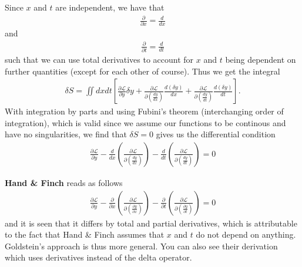 \documentclass[a4paper]{article}
\begin{document}
    Since \(x\) and \(t\) are independent, we have that \begin{align*}
        \frac{\partial}{\partial x} = \frac{d}{dx} 
    \end{align*} 
    and \begin{align*}
        \frac{\partial }{\partial t} = \frac{d}{dt} 
    \end{align*}
    such that we can use total derivatives to account for \(x\) and \(t\) being dependent on further quantities (except for each other of course). Thus we get the integral \begin{align*}
        \delta S = \iint dx dt \left[ \frac{\partial \mathcal{L}}{\partial y} \delta y + \frac{\partial \mathcal{L}}{\partial \left( \frac{d y}{d x}  \right)}\frac{d (\delta y)}{d x} + \frac{\partial \mathcal{L}}{\partial \left( \frac{d y}{d t}  \right)}\frac{d (\delta y)}{d t}  \right].
    \end{align*} 
    With integration by parts and using Fubini's theorem (interchanging order of integration), which is valid since we assume our functions to be continous and have no singularities, we find that \(\delta S = 0\) gives us the differential condition
      \begin{align*}
        \frac{\partial \mathcal{L} }{\partial y} - \frac{d}{d x}\left( \frac{\partial \mathcal{L} }{\partial \left( \frac{d y}{d x}  \right) }  \right) - \frac{d}{d t}\left( \frac{\partial \mathcal{L} }{\partial \left( \frac{d y}{d t}  \right) }  \right) = 0
    \end{align*}

    \textbf{Hand \& Finch} reads as follows \begin{align*}
        \frac{\partial \mathcal{L} }{\partial y} - \frac{\partial}{\partial x}\left( \frac{\partial \mathcal{L} }{\partial \left( \frac{\partial y}{\partial x}  \right) }  \right) - \frac{\partial}{\partial t}\left( \frac{\partial \mathcal{L} }{\partial \left( \frac{\partial y}{\partial t}  \right) }  \right) = 0
    \end{align*}
    and it is seen that it differs by total and partial derivatives, which is attributable to the fact that Hand \& Finch assumes that \(x\) and \(t\) do not depend on anything. Goldstein's approach is thus more general. You can also see their derivation which uses derivatives instead of the delta operator.
    
\end{document}
